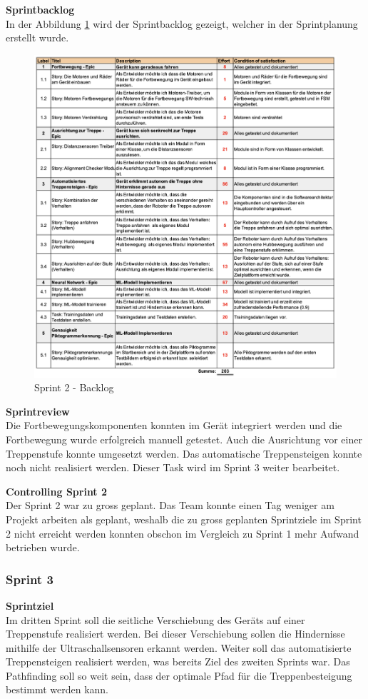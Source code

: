 \textbf{Sprintbacklog}\\
In der Abbildung \ref{fig:sprint-backlog-2} wird der Sprintbacklog gezeigt, welcher in der Sprintplanung erstellt wurde.
\begin{figure}[H]
  \includegraphics[width=1.0\textwidth]{img/projektmanagement/Sprint 2.png}
  \centering
  \caption{Sprint 2 - Backlog}
  \label{fig:sprint-backlog-2}
\end{figure}

\textbf{Sprintreview}\\
Die Fortbewegungskomponenten konnten im Gerät integriert werden und die Fortbewegung wurde erfolgreich manuell getestet. Auch die Ausrichtung vor einer Treppenstufe konnte umgesetzt werden. Das automatische Treppensteigen konnte noch nicht realisiert werden. Dieser Task wird im Sprint 3 weiter bearbeitet.

\textbf{Controlling Sprint 2}\\
Der Sprint 2 war zu gross geplant. Das Team konnte einen Tag weniger am Projekt arbeiten als geplant, weshalb die zu gross geplanten Sprintziele im Sprint 2 nicht erreicht werden konnten obschon im Vergleich zu Sprint 1 mehr Aufwand betrieben wurde.


\subsubsection{Sprint 3}
\textbf{Sprintziel}\\
Im dritten Sprint soll die seitliche Verschiebung des Geräts auf einer Treppenstufe realisiert werden. Bei dieser Verschiebung sollen die Hindernisse mithilfe der Ultraschallsensoren erkannt werden. Weiter soll das automatisierte Treppensteigen realisiert werden, was bereits Ziel des zweiten Sprints war. Das Pathfinding soll so weit sein, dass der optimale Pfad für die Treppenbesteigung bestimmt werden kann.

